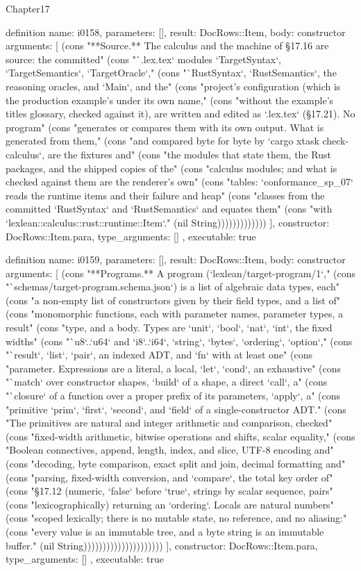 \begin{lexlean}{Chapter17}
\begin{semanticmodule}
definition{
  name: i0158,
  parameters: [],
  result: DocRows::Item,
  body: constructor{
    arguments: [
      (cons "**Source.** The calculus and the machine of §17.16 are source: the committed" (cons "`.lex.tex` modules `TargetSyntax`, `TargetSemantics`, `TargetOracle`," (cons "`RustSyntax`, `RustSemantics`, the reasoning oracles, and `Main`, and the" (cons "project's configuration (which is the production example's under its own name," (cons "without the example's titles glossary, checked against it), are written and edited as `.lex.tex` (§17.21). No program" (cons "generates or compares them with its own output. What is generated from them," (cons "and compared byte for byte by `cargo xtask check-calculus`, are the fixtures and" (cons "the modules that state them, the Rust packages, and the shipped copies of the" (cons "calculus modules; and what is checked against them are the renderer's own" (cons "tables: `conformance_sp_07` reads the runtime items and their failure and heap" (cons "classes from the committed `RustSyntax` and `RustSemantics` and equates them" (cons "with `lexlean::calculus::rust::runtime::Item`." (nil String)))))))))))))
    ],
    constructor: DocRows::Item.para,
    type_arguments: []
  },
  executable: true
}

definition{
  name: i0159,
  parameters: [],
  result: DocRows::Item,
  body: constructor{
    arguments: [
      (cons "**Programs.** A program (`lexlean/target-program/1`," (cons "`schemas/target-program.schema.json`) is a list of algebraic data types, each" (cons "a non-empty list of constructors given by their field types, and a list of" (cons "monomorphic functions, each with parameter names, parameter types, a result" (cons "type, and a body. Types are `unit`, `bool`, `nat`, `int`, the fixed widths" (cons "`u8`..`u64` and `i8`..`i64`, `string`, `bytes`, `ordering`, `option`," (cons "`result`, `list`, `pair`, an indexed ADT, and `fn` with at least one" (cons "parameter. Expressions are a literal, a local, `let`, `cond`, an exhaustive" (cons "`match` over constructor shapes, `build` of a shape, a direct `call`, a" (cons "`closure` of a function over a proper prefix of its parameters, `apply`, a" (cons "primitive `prim`, `first`, `second`, and `field` of a single-constructor ADT." (cons "The primitives are natural and integer arithmetic and comparison, checked" (cons "fixed-width arithmetic, bitwise operations and shifts, scalar equality," (cons "Boolean connectives, append, length, index, and slice, UTF-8 encoding and" (cons "decoding, byte comparison, exact split and join, decimal formatting and" (cons "parsing, fixed-width conversion, and `compare`, the total key order of" (cons "§17.12 (numeric, `false` before `true`, strings by scalar sequence, pairs" (cons "lexicographically) returning an `ordering`. Locals are natural numbers" (cons "scoped lexically; there is no mutable state, no reference, and no aliasing:" (cons "every value is an immutable tree, and a byte string is an immutable buffer." (nil String)))))))))))))))))))))
    ],
    constructor: DocRows::Item.para,
    type_arguments: []
  },
  executable: true
}


\end{semanticmodule}
\end{lexlean}
